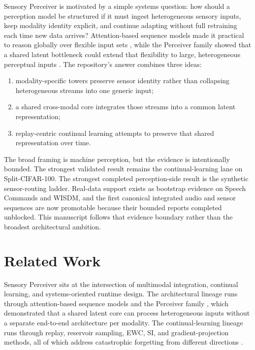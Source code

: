 \documentclass{article}
\begin{document}
Sensory Perceiver is motivated by a simple systems question: how should a perception model be structured if it must ingest heterogeneous sensory inputs, keep modality identity explicit, and continue adapting without full retraining each time new data arrives? Attention-based sequence models made it practical to reason globally over flexible input sets \citep{cite1}, while the Perceiver family showed that a shared latent bottleneck could extend that flexibility to large, heterogeneous perceptual inputs \citep{cite2,cite3}. The repository's answer combines three ideas:
\begin{enumerate}[leftmargin=*]
  \item modality-specific towers preserve sensor identity rather than collapsing heterogeneous streams into one generic input;
  \item a shared cross-modal core integrates those streams into a common latent representation;
  \item replay-centric continual learning attempts to preserve that shared representation over time.
\end{enumerate}

The broad framing is machine perception, but the evidence is intentionally bounded. The strongest validated result remains the continual-learning lane on Split-CIFAR-100. The strongest completed perception-side result is the synthetic sensor-routing ladder. Real-data support exists as bootstrap evidence on Speech Commands and WISDM, and the first canonical integrated audio and sensor sequences are now promotable because their bounded reports completed unblocked. This manuscript follows that evidence boundary rather than the broadest architectural ambition.

\section{Related Work}

Sensory Perceiver sits at the intersection of multimodal integration, continual learning, and systems-oriented runtime design. The architectural lineage runs through attention-based sequence models \citep{cite1,cite4,cite5,cite6,cite7} and the Perceiver family \citep{cite2,cite3}, which demonstrated that a shared latent core can process heterogeneous inputs without a separate end-to-end architecture per modality. The continual-learning lineage runs through replay, reservoir sampling, EWC, SI, and gradient-projection methods, all of which address catastrophic forgetting from different directions \citep{kirkpatrick2017,lopezmanzanares2017,chaudhry2019,buzzega2020}.
\end{document}
